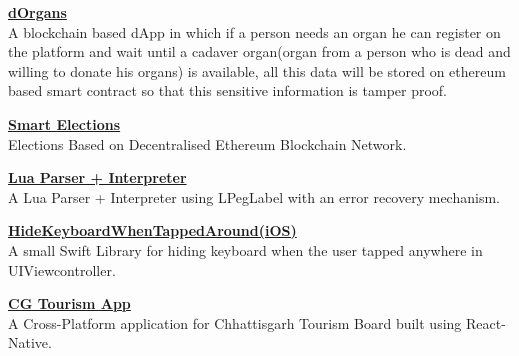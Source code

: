 \documentclass{article}
\begin{document}
\noindent \normalsize \href{https://bit.ly/healthJ}{\textbf{dOrgans}} \\
\noindent \normalsize A blockchain based dApp in which if a person needs an organ he can register on the platform and wait until a cadaver organ(organ from a person who is dead and willing to donate his organs) is available, all this data will be stored on ethereum based smart contract so that this sensitive information is tamper proof.
\vspace{5pt}

\noindent \normalsize \href{https://github.com/Shritesh99/Smart-Elections_Solidity}{\textbf{Smart Elections}} \\
\noindent \normalsize Elections Based on Decentralised Ethereum Blockchain Network.
\vspace{5pt}

\noindent \normalsize \href{https://gist.github.com/0a9d7b1a040249d1b525ab94198a42ac}{\textbf{Lua Parser + Interpreter}} \\
\noindent \normalsize A Lua Parser + Interpreter using LPegLabel with an error recovery mechanism.
\vspace{5pt}

\noindent \normalsize \href{https://bit.ly/3a62RB4}{\textbf{HideKeyboardWhenTappedAround(iOS)}} \\
\noindent \normalsize A small Swift Library for hiding keyboard when the user tapped anywhere in UIViewcontroller.
\vspace{5pt}

\noindent \normalsize \href{https://bit.ly/CG_App}{\textbf{CG Tourism App}} \\
\noindent \normalsize A Cross-Platform application for Chhattisgarh Tourism Board built using React-Native.
\end{document}
